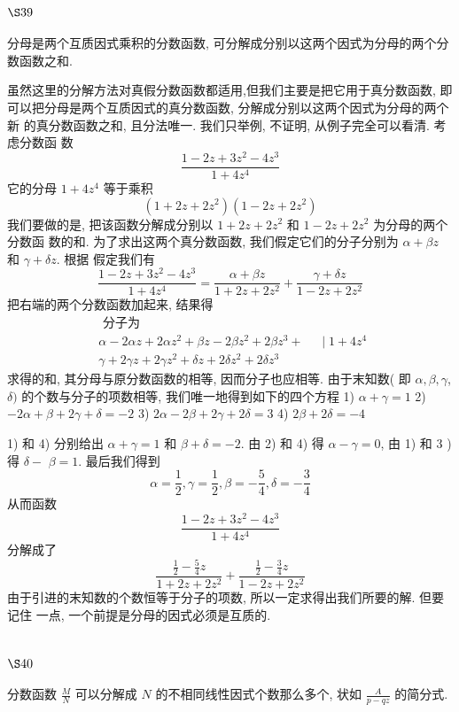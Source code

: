 \section{$\S 39$}

分母是两个互质因式乘积的分数函数, 可分解成分别以这两个因式为分母的两个分 数函数之和.

虽然这里的分解方法对真假分数函数都适用,但我们主要是把它用于真分数函数, 即可以把分母是两个互质因式的真分数函数, 分解成分别以这两个因式为分母的两个新 的真分数函数之和, 且分法唯一. 我们只举例, 不证明, 从例子完全可以看清. 考虑分数函 数
\[
\frac{1-2 z+3 z^{2}-4 z^{3}}{1+4 z^{4}}
\]
它的分母 $1+4 z^{4}$ 等于乘积
\[
\left(1+2 z+2 z^{2}\right)\left(1-2 z+2 z^{2}\right)
\]
我们要做的是, 把该函数分解成分别以 $1+2 z+2 z^{2}$ 和 $1-2 z+2 z^{2}$ 为分母的两个分数函 数的和. 为了求出这两个真分数函数, 我们假定它们的分子分别为 $\alpha+\beta z$ 和 $\gamma+\delta z$. 根据 假定我们有
\[
\frac{1-2 z+3 z^{2}-4 z^{3}}{1+4 z^{4}}=\frac{\alpha+\beta z}{1+2 z+2 z^{2}}+\frac{\gamma+\delta z}{1-2 z+2 z^{2}}
\]
把右端的两个分数函数加起来, 结果得
\[
\begin{array}{l|l}
\text { 分子为 } \\
\alpha-2 \alpha z+2 \alpha z^{2}+\beta z-2 \beta z^{2}+2 \beta z^{3}+ & \\
\gamma+2 \gamma z+2 \gamma z^{2}+\delta z+2 \delta z^{2}+2 \delta z^{3}
\end{array} \mid 1+4 z^{4}
\]
求得的和, 其分母与原分数函数的相等, 因而分子也应相等. 由于末知数( 即 $\alpha, \beta, \gamma$, $\delta)$ 的个数与分子的项数相等, 我们唯一地得到如下的四个方程
1) $\alpha+\gamma=1$
2) $-2 \alpha+\beta+2 \gamma+\delta=-2$
3) $2 \alpha-2 \beta+2 \gamma+2 \delta=3$
4) $2 \beta+2 \delta=-4$

1) 和 4) 分别给出 $\alpha+\gamma=1$ 和 $\beta+\delta=-2$. 由 2) 和 4) 得 $\alpha-\gamma=0$, 由 1) 和 3 ) 得 $\delta-$ $\beta=1$. 最后我们得到
\[
\alpha=\frac{1}{2}, \gamma=\frac{1}{2}, \beta=-\frac{5}{4}, \delta=-\frac{3}{4}
\]
从而函数 
\[
\frac{1-2 z+3 z^{2}-4 z^{3}}{1+4 z^{4}}
\]
分解成了
\[
\frac{\frac{1}{2}-\frac{5}{4} z}{1+2 z+2 z^{2}}+\frac{\frac{1}{2}-\frac{3}{4} z}{1-2 z+2 z^{2}}
\]
由于引进的末知数的个数恒等于分子的项数, 所以一定求得出我们所要的解. 但要记住 一点, 一个前提是分母的因式必须是互质的.

\section{$\S 40$}

分数函数 $\frac{M}{N}$ 可以分解成 $N$ 的不相同线性因式个数那么多个, 状如 $\frac{A}{p-q z}$ 的简分式.

